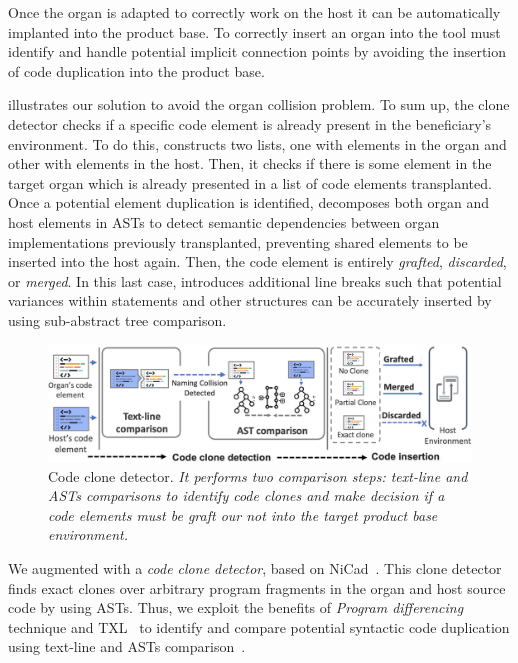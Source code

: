 Once the organ is adapted to correctly work on the host it can be automatically implanted into the product base. To correctly insert an organ into the tool must identify and handle potential implicit connection points by avoiding the insertion of code duplication into the product base.

 illustrates our solution to avoid the organ collision problem. To sum up, the clone detector checks if a specific code element is already present in the beneficiary's environment. To do this, \prodscalpel constructs two lists, one with elements in the organ and other with elements in the host. Then, it checks if there is some element in the target organ which is already presented in a list of code elements transplanted. Once a potential element duplication is identified, \prodscalpel decomposes both organ and host elements in ASTs to detect semantic dependencies between organ implementations previously transplanted, preventing shared elements to be inserted into the host again. Then, the code element is entirely \emph{grafted}, \emph{discarded}, or \emph{merged}. In this last case, \prodscalpel introduces additional line breaks such that potential variances within statements and other structures can be accurately inserted by using sub-abstract tree comparison.

\begin{figure}[t]
	\centering \includegraphics[width=\textwidth]{images/clone_detector.png}
	\caption{Code clone detector. \textit{It performs two comparison steps: text-line and ASTs comparisons to identify code clones and make decision if a code elements must be graft our not into the target product base environment.}}
	\label{fig:code_clone_analysis}
\end{figure} 

We augmented \prodscalpel with a \emph{code clone detector}, based on NiCad~\cite{Roy2009}. This clone detector finds exact clones over arbitrary program fragments in the organ and host source code by using ASTs. Thus, we exploit the benefits of \emph{Program differencing}~\cite{Kernighan1983} technique and TXL~\cite{Cordy2006} to identify and compare potential syntactic code duplication using text-line and ASTs comparison~\cite{Roy2009}.

